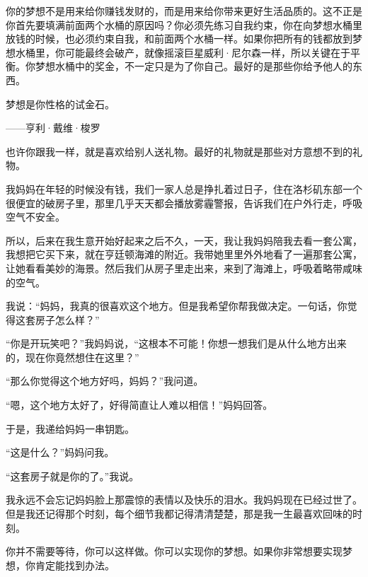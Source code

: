 你的梦想不是用来给你赚钱发财的，而是用来给你带来更好生活品质的。这不正是你首先要填满前面两个水桶的原因吗？你必须先练习自我约束，你在向梦想水桶里放钱的时候，也必须约束自我，和前面两个水桶一样。如果你把所有的钱都放到梦想水桶里，你可能最终会破产，就像摇滚巨星威利·尼尔森一样，所以关键在于平衡。你梦想水桶中的奖金，不一定只是为了你自己。最好的是那些你给予他人的东西。

\begin{BookQuote}
梦想是你性格的试金石。

\hfill ——亨利·戴维·梭罗
\end{BookQuote}

也许你跟我一样，就是喜欢给别人送礼物。最好的礼物就是那些对方意想不到的礼物。

我妈妈在年轻的时候没有钱，我们一家人总是挣扎着过日子，住在洛杉矶东部一个很便宜的破房子里，那里几乎天天都会播放雾霾警报，告诉我们在户外行走，呼吸空气不安全。

所以，后来在我生意开始好起来之后不久，一天，我让我妈妈陪我去看一套公寓，我想把它买下来，就在亨廷顿海滩的附近。我带她里里外外地看了一遍那套公寓，让她看看美妙的海景。然后我们从房子里走出来，来到了海滩上，呼吸着略带咸味的空气。

我说：“妈妈，我真的很喜欢这个地方。但是我希望你帮我做决定。一句话，你觉得这套房子怎么样？”

“你是开玩笑吧？”我妈妈说，“这根本不可能！你想一想我们是从什么地方出来的，现在你竟然想住在这里？”

“那么你觉得这个地方好吗，妈妈？”我问道。

“嗯，这个地方太好了，好得简直让人难以相信！”妈妈回答。

于是，我递给妈妈一串钥匙。

“这是什么？”妈妈问我。

“这套房子就是你的了。”我说。

我永远不会忘记妈妈脸上那震惊的表情以及快乐的泪水。我妈妈现在已经过世了。但是我还记得那个时刻，每个细节我都记得清清楚楚，那是我一生最喜欢回味的时刻。

你并不需要等待，你可以这样做。你可以实现你的梦想。如果你非常想要实现梦想，你肯定能找到办法。

